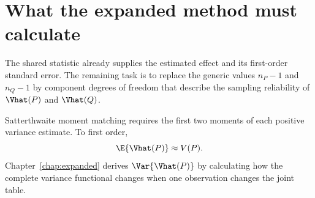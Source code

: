 \section{What the expanded method must calculate}

The shared statistic already supplies the estimated effect and its first-order
standard error. The remaining task is to replace the generic values
\(n_P-1\) and \(n_Q-1\) by component degrees of freedom that describe the
sampling reliability of \(\Vhat(P)\) and \(\Vhat(Q)\).

Satterthwaite moment matching requires the first two moments of each positive
variance estimate. To first order,
\begin{equation}
  \E\{\Vhat(P)\}\approx V(P).
\end{equation}
Chapter~\ref{chap:expanded} derives
\(\Var\{\Vhat(P)\}\) by calculating how the complete variance functional
changes when one observation changes the joint table.
